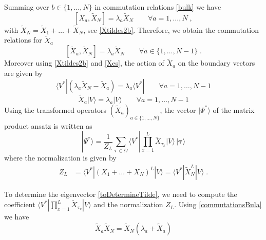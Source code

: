 \documentclass[10pt]{article}
\numberwithin{equation}{section}
\numberwithin{equation}{subsection}
\newcommand{\Xt}{\widetilde{X}}
\newcommand{\co}{\;,}
\newcommand{\dt}{\;.}
\begin{document}
Summing over $b\in \{1,\ldots,N\}$ in commutation relations \eqref{bulk} we have
\begin{equation} 
	\left[X_{a},\Xt_{N}\right]=\lambda_{a}\Xt_{N}\qquad\forall a=1,\ldots,N\co
\end{equation}
with $\widetilde{X}_{N}=\widetilde{X}_{1}+\ldots+\widetilde{X}_{N}$, see \eqref{Xtildes2b}. 
Therefore, we obtain the commutation relations for $\Xt_{a}$ 
\begin{equation}\label{commutationsBula}
	\left[\Xt_{a},\Xt_{N}\right]=\lambda_{a}\Xt_{N}\qquad \forall a\in \{1,\ldots,N-1\}\dt
\end{equation}
Moreover using \eqref{Xtildes2b} and \eqref{Xes}, the action of $\Xt_{a}$ on the boundary vectors are given by 
\begin{equation}\label{commLEFT}
	\langle V^{*}|\left(\lambda_{a}\Xt_{N}-\Xt_{a}\right)=\lambda_{a}\langle V^{*}|\qquad\forall a=1,\ldots,N-1
\end{equation}
\begin{equation}\label{commRIGHT}
	\Xt_{a} |V\rangle= \lambda_{a}|V\rangle\qquad\forall a=1,\ldots,N-1
\end{equation} 
Using the transformed operators $(\widetilde{X}_{a})_{a\in\{1,\ldots,N\}}$, the vector $|\Psi^{''}\rangle$ of the matrix product ansatz is written as
\begin{equation}\label{toDetermineTilde}
	|\Psi^{''}\rangle = \frac{1}{Z_{L}}\sum_{\bm{\tau}\in \Omega}\langle V^{*}|\prod_{x=1}^{L}\widetilde{X}_{\tau_{x}}
	|V \rangle \,|\bm{\tau}\rangle
\end{equation}
where the normalization is given by 
\begin{align}
		Z_{L}&=\langle V^{*}|(X_{1}+\ldots+X_{N})^{L}|V\rangle=\langle V^{*}|\widetilde{X}_{N}^{L}|V\rangle\dt
\end{align}
\begin{comment}
The basis is 
$$
|\bm{n}\rangle =|n_{1}^{1},\ldots,n_{N}^{1}\rangle \otimes \ldots\otimes |n_{1}^{L},\ldots,n_{N}^{L}\rangle
$$
such that, for each site $x\in \{1,\ldots,L\}$, $|n^{x}\rangle=|n_{1}^{x},\ldots,n_{N}^{x}\rangle\in \Omega_{x}$. \\
\end{comment}
To determine the eigenvector \eqref{toDetermineTilde}, we need to compute the coefficient $\langle V^{*}|\prod_{x=1}^{L}\widetilde{X}_{\tau_{x}}
|V \rangle$ and the normalization $Z_{L}$. Using \eqref{commutationsBula} we have
\begin{equation}\label{UsefulRelation}
	\widetilde{X}_{a}\widetilde{X}_{N}=\widetilde{X}_{N}\left(\lambda_{a}+\widetilde{X}_{a}\right)
\end{equation}
\end{document}
